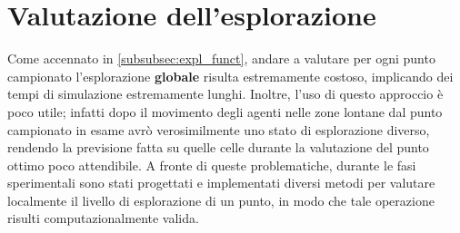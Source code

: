 \section{Valutazione dell'esplorazione} \label{sec:valutazione_esplorazione}
Come accennato in \ref{subsubsec:expl_funct}, andare a valutare per ogni punto campionato l'esplorazione \textbf{globale} risulta estremamente costoso, implicando dei tempi di simulazione estremamente lunghi.
Inoltre, l'uso di questo approccio è poco utile; infatti dopo il movimento degli agenti nelle zone lontane dal punto campionato in esame avrò verosimilmente uno stato di esplorazione diverso, rendendo la previsione fatta su quelle celle durante la valutazione del punto ottimo poco attendibile.
A fronte di queste problematiche, durante le fasi sperimentali sono stati progettati e implementati diversi metodi per valutare localmente il livello di esplorazione di un punto, in modo che tale operazione risulti computazionalmente valida.


